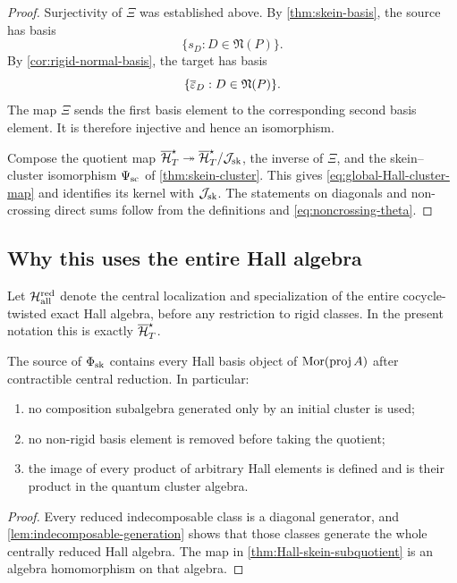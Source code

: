 \begin{proof}
Surjectivity of $\Xi$ was established above.  By
\cref{thm:skein-basis}, the source has basis
\[
 \{s_D:D\in\mathfrak N(P)\}.
\]
By \cref{cor:rigid-normal-basis}, the target has basis
\[
 \{\overline{\varepsilon}_D:D\in\mathfrak N(P)\}.
\]
The map $\Xi$ sends the first basis element to the corresponding second basis
element.  It is therefore injective and hence an isomorphism.

Compose the quotient map
$\overline{\mathcal H}_{T}^{\star}\twoheadrightarrow\overline{\mathcal H}_{T}^{\star}/\mathcal J_{\mathrm{sk}}$, the inverse of $\Xi$, and the
skein--cluster isomorphism $\Psi_{\rm sc}$ of
\cref{thm:skein-cluster}.  This gives \eqref{eq:global-Hall-cluster-map} and
identifies its kernel with $\mathcal J_{\mathrm{sk}}$.  The statements on diagonals and
non-crossing direct sums follow from the definitions and
\eqref{eq:noncrossing-theta}.
\end{proof}

\subsection{Why this uses the entire Hall algebra}

Let $\mathcal H^{\rm red}_{\rm all}$ denote the central localization and
specialization of the entire cocycle-twisted exact Hall algebra, before any
restriction to rigid classes.  In the present notation this is exactly
$\overline{\mathcal H}_{T}^{\star}$.

\begin{corollary}
\label{cor:whole-Hall}
The source of $\Phi_{\rm sk}$ contains every Hall basis object of
$\operatorname{Mor}(\operatorname{proj} A)$ after contractible central reduction.  In particular:
\begin{enumerate}[label=(\roman*),leftmargin=2.3em]
\item no composition subalgebra generated only by an initial cluster is used;
\item no non-rigid basis element is removed before taking the quotient;
\item the image of every product of arbitrary Hall elements is defined and is
      their product in the quantum cluster algebra.
\end{enumerate}
\end{corollary}

\begin{proof}
Every reduced indecomposable class is a diagonal generator, and
\cref{lem:indecomposable-generation} shows that those classes generate the
whole centrally reduced Hall algebra.  The map in
\cref{thm:Hall-skein-subquotient} is an algebra homomorphism on that algebra.
\end{proof}

